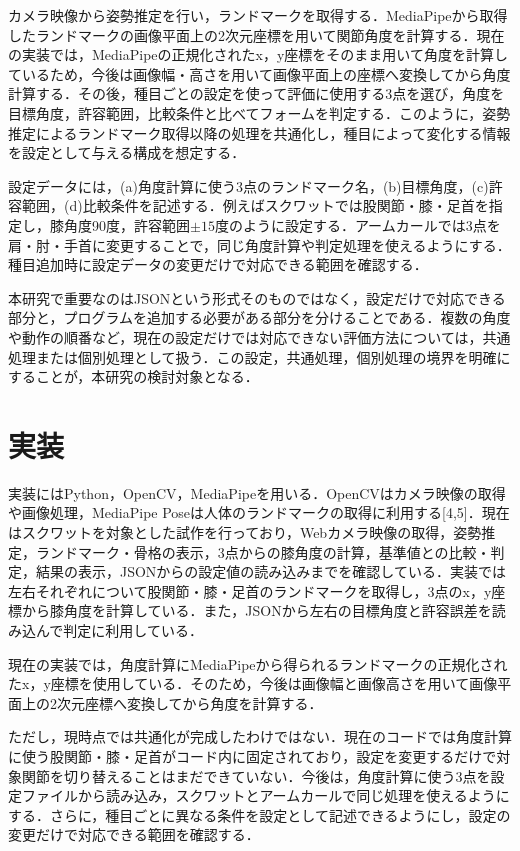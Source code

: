 \documentclass[no-page-number]{nanzan-abstract}
\begin{document}
カメラ映像から姿勢推定を行い，ランドマークを取得する．MediaPipeから取得したランドマークの画像平面上の2次元座標を用いて関節角度を計算する．現在の実装では，MediaPipeの正規化されたx，y座標をそのまま用いて角度を計算しているため，今後は画像幅・高さを用いて画像平面上の座標へ変換してから角度計算する．その後，種目ごとの設定を使って評価に使用する3点を選び，角度を目標角度，許容範囲，比較条件と比べてフォームを判定する．このように，姿勢推定によるランドマーク取得以降の処理を共通化し，種目によって変化する情報を設定として与える構成を想定する．

設定データには，(a)角度計算に使う3点のランドマーク名，(b)目標角度，(c)許容範囲，(d)比較条件を記述する．例えばスクワットでは股関節・膝・足首を指定し，膝角度90度，許容範囲$\pm15$度のように設定する．アームカールでは3点を肩・肘・手首に変更することで，同じ角度計算や判定処理を使えるようにする．種目追加時に設定データの変更だけで対応できる範囲を確認する．

本研究で重要なのはJSONという形式そのものではなく，設定だけで対応できる部分と，プログラムを追加する必要がある部分を分けることである．複数の角度や動作の順番など，現在の設定だけでは対応できない評価方法については，共通処理または個別処理として扱う．この設定，共通処理，個別処理の境界を明確にすることが，本研究の検討対象となる．

\section{実装}

実装にはPython，OpenCV，MediaPipeを用いる．OpenCVはカメラ映像の取得や画像処理，MediaPipe Poseは人体のランドマークの取得に利用する[4,5]．現在はスクワットを対象とした試作を行っており，Webカメラ映像の取得，姿勢推定，ランドマーク・骨格の表示，3点からの膝角度の計算，基準値との比較・判定，結果の表示，JSONからの設定値の読み込みまでを確認している．実装では左右それぞれについて股関節・膝・足首のランドマークを取得し，3点のx，y座標から膝角度を計算している．また，JSONから左右の目標角度と許容誤差を読み込んで判定に利用している．

現在の実装では，角度計算にMediaPipeから得られるランドマークの正規化されたx，y座標を使用している．そのため，今後は画像幅と画像高さを用いて画像平面上の2次元座標へ変換してから角度を計算する．

ただし，現時点では共通化が完成したわけではない．現在のコードでは角度計算に使う股関節・膝・足首がコード内に固定されており，設定を変更するだけで対象関節を切り替えることはまだできていない．今後は，角度計算に使う3点を設定ファイルから読み込み，スクワットとアームカールで同じ処理を使えるようにする．さらに，種目ごとに異なる条件を設定として記述できるようにし，設定の変更だけで対応できる範囲を確認する．
\end{document}
